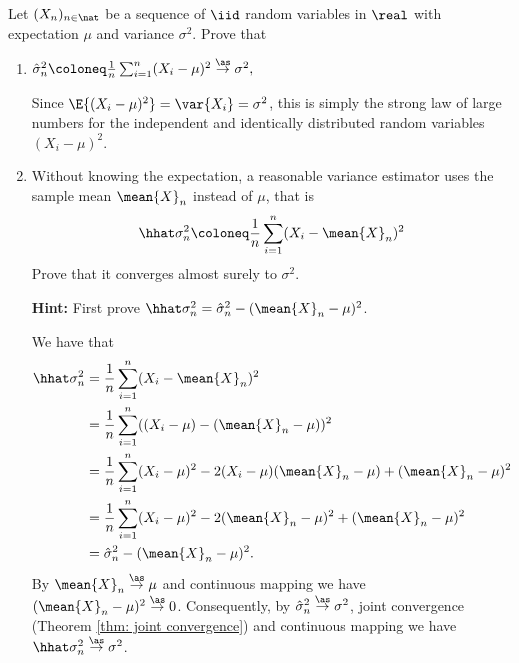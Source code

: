 \begin{exercise}
    \label{ex: variance estimation}
    Let \((X_n)_{n\in \nat}\) be a sequence of \(\iid\) random variables in \(\real\)
    with expectation \(\mu\) and variance \(\sigma^2\). Prove that
    \begin{enumerate}[label=(\alph*),noitemsep]
        \item 
        \(
            \hat\sigma^2_n \coloneq \frac1n\sum_{i=1}^n (X_i-\mu)^2
            \overset{\as}\to \sigma^2,
        \)
        \begin{solution}
            Since \(\E{(X_i-\mu)^2} = \var{X_i} = \sigma^2\), this is
            simply the strong law of large numbers for the independent and identically
            distributed random variables \((X_i-\mu)^2\).
        \end{solution}

        \item Without knowing the expectation, a reasonable variance estimator
        uses the sample mean \(\mean{X}_n\) instead of \(\mu\), that is
        \[
            \hhat\sigma_n^2 \coloneq \frac1n\sum_{i=1}^n (X_i-\mean{X}_n)^2
        \]
        Prove that it converges almost surely to \(\sigma^2\).
        
        \textbf{Hint:} First prove \(\hhat\sigma_n^2 = \hat\sigma_n^2 - (\mean{X}_n - \mu)^2\).
        \begin{solution}
            We have that
            \begin{align}
                \nonumber
                \hhat\sigma_n^2
                &= \frac1n\sum_{i=1}^n (X_i-\mean{X}_n)^2
                \\
                \nonumber
                &= \frac1n\sum_{i=1}^n ((X_i-\mu) - (\mean{X}_n - \mu))^2
                \\
                \nonumber
                &= \frac1n\sum_{i=1}^n (X_i-\mu)^2 - 2(X_i-\mu)(\mean{X}_n - \mu) + (\mean{X}_n - \mu)^2
                \\
                \nonumber
                &= \frac1n\sum_{i=1}^n (X_i-\mu)^2 - 2(\mean{X}_n - \mu)^2 + (\mean{X}_n - \mu)^2
                \\
                \label{eq: variance estimator decomposition}
                &= \hat\sigma_n^2 - (\mean{X}_n - \mu)^2.
            \end{align}
            By \(\mean{X}_n \overset{\as}\to \mu\) and continuous mapping
            we have \((\mean{X}_n - \mu)^2 \overset{\as}\to 0\). Consequently,
            by \(\hat\sigma_n^2 \overset{\as}\to \sigma^2\), joint convergence
            (Theorem \ref{thm: joint convergence}) and continuous mapping we have
            \(\hhat\sigma_n^2 \overset{\as}\to \sigma^2\).
        \end{solution}


\end{enumerate}
\end{exercise}
